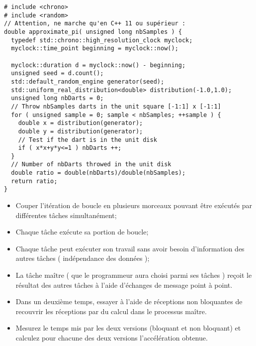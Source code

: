\documentclass[11pt,a4paper]{article}
\begin{document}
\begin{lstlisting}[style=customcpp]
# include <chrono>
# include <random>
// Attention, ne marche qu'en C++ 11 ou supérieur :
double approximate_pi( unsigned long nbSamples ) {
  typedef std::chrono::high_resolution_clock myclock;
  myclock::time_point beginning = myclock::now();

  myclock::duration d = myclock::now() - beginning;
  unsigned seed = d.count();
  std::default_random_engine generator(seed);
  std::uniform_real_distribution<double> distribution(-1.0,1.0);
  unsigned long nbDarts = 0;
  // Throw nbSamples darts in the unit square [-1:1] x [-1:1]
  for ( unsigned sample = 0; sample < nbSamples; ++sample ) {
    double x = distribution(generator);
    double y = distribution(generator);
    // Test if the dart is in the unit disk
    if ( x*x+y*y<=1 ) nbDarts ++;
  }
  // Number of nbDarts throwed in the unit disk
  double ratio = double(nbDarts)/double(nbSamples);
  return ratio;
}
\end{lstlisting}

\begin{itemize}
\item Couper l'itération de boucle en plusieurs morceaux pouvant être exécutés par différentes tâches
simultanément;
\item Chaque tâche exécute sa portion de boucle;
\item Chaque tâche peut exécuter son travail sans avoir besoin d'information des autres tâches ( indépendance
des données );
\item La tâche maître ( que le programmeur aura choisi parmi ses tâches ) reçoit le résultat des autres
tâches à l'aide d'échanges de message point à point.
\item Dans un deuxième temps, essayer à l'aide de réceptions non bloquantes de recouvrir les réceptions par du
calcul dans le processus maître.
\item Mesurez le temps mis par les deux versions (bloquant et non bloquant) et calculez pour chacune des deux versions
l'accélération obtenue.
\end{itemize}

\begin{center}
\end{center}
\end{document}
